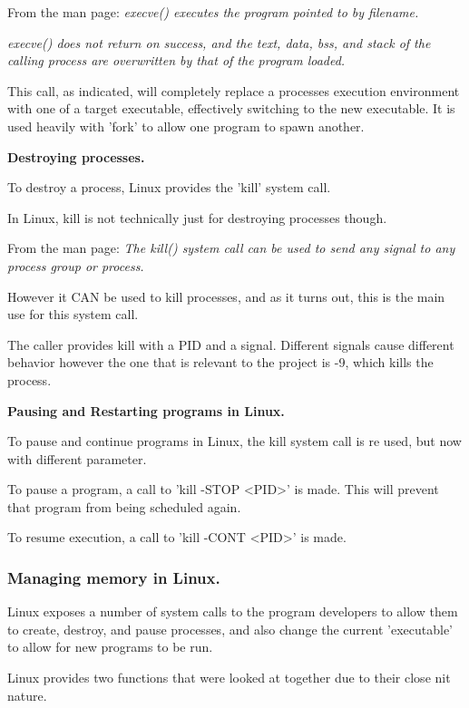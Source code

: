 \documentclass[a4paper]{report}
\begin{document}
From the man page:
\textit {execve()  executes the program pointed to by filename.}

\textit {execve() does not return on success, and the  text,  data,  bss,  and stack  of  the calling process are overwritten by that of the program loaded.} \cite{manExecve}

This call, as indicated, will completely replace a processes execution environment with one of a target executable, effectively switching to the new executable. It is used heavily with 'fork' to allow one program to spawn another.

\textbf{Destroying processes.}

To destroy a process, Linux provides the 'kill' system call.

In Linux, kill is not technically just for destroying processes though.

From the man page:
\textit{The kill() system call can be used to send any signal to any process group or process.}\cite{manKill}

However it CAN be used to kill processes, and as it turns out, this is the main use for this system call.

The caller provides kill with a PID and a signal. Different signals cause different behavior however the one that is relevant to the project is -9, which kills the process.


\textbf{Pausing and Restarting programs in Linux.}

To pause and continue programs in Linux, the kill system call is re used, but now with different parameter.

To pause a program, a call to 'kill -STOP \textless PID\textgreater' is made. This will prevent that program from being scheduled again.

To resume execution, a call to 'kill -CONT \textless PID\textgreater' is made.



\subsubsection*{Managing memory in Linux.}

Linux exposes a number of system calls to the program developers to allow them to create, destroy, and pause processes, and also change the current 'executable' to allow for new programs to be run.

Linux provides two functions that were looked at together due to their close nit nature.
\end{document}
